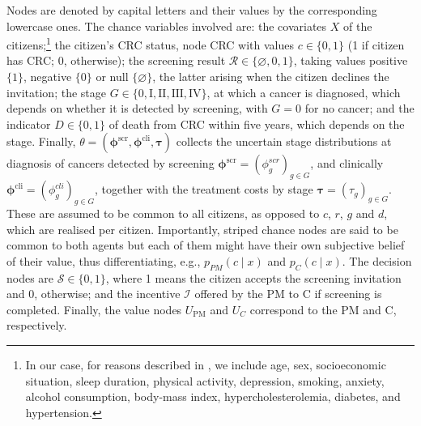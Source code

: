 \documentclass[12pt]{article}
\begin{document}
Nodes are denoted by capital letters and their values by the corresponding lowercase ones. The chance variables involved are: the covariates $X$ of the citizens;\footnote{In our case, for reasons described in \cite{corrales2024colorectal}, we include age, sex, socioeconomic situation, sleep duration, physical activity, depression, smoking, anxiety, alcohol consumption, body-mass index, hypercholesterolemia, diabetes, and hypertension.} the citizen's CRC status, node CRC with values $c \in \{0,1\}$ (1 if citizen has CRC; 0, otherwise); the screening result $\mathcal{R} \in \{\varnothing, 0, 1\}$, taking values positive $\{1\}$, negative $\{0\}$ or null $\{\varnothing\}$, the latter arising when the citizen declines the invitation; the stage $G \in \{0, \text{I}, \text{II}, \text{III}, \text{IV}\}$, at which a cancer is diagnosed, which depends on whether it is detected by screening, with $G=0$ for no cancer; and the indicator $D \in \{0,1\}$ of death from CRC within five years, which depends on the stage. Finally, $\theta = (\boldsymbol{\phi}^{\text{scr}}, \boldsymbol{\phi}^{\text{cli}}, \boldsymbol{\tau})$ collects the uncertain stage distributions at diagnosis of cancers detected by screening $\boldsymbol{\phi}^{\text{scr}} = (\phi_g^{scr})_{g \in G}$, and clinically $\boldsymbol{\phi}^{\text{cli}} =  (\phi_g^{cli})_{g \in G}$, together with the treatment costs by stage $\boldsymbol{\tau} = (\tau_{g})_{g \in G}$. These are assumed to be common to all citizens, as opposed to $c$, $r$, $g$ and $d$, which are realised per citizen. Importantly, striped chance nodes are said to be common to both agents but each of them might have their own subjective belief of their value, thus differentiating, e.g., $p_{PM}(c \mid x)$ and $p_{C}(c \mid x)$. The decision nodes are $\mathcal{S} \in \{0,1\}$, where 1 means the citizen accepts the screening invitation and 0, otherwise; and the incentive $\mathcal{I}$ offered by the PM to C if screening is completed. Finally, the value nodes $U_{\text{PM}}$ and $U_C$ correspond to the PM and C, respectively.
\end{document}

